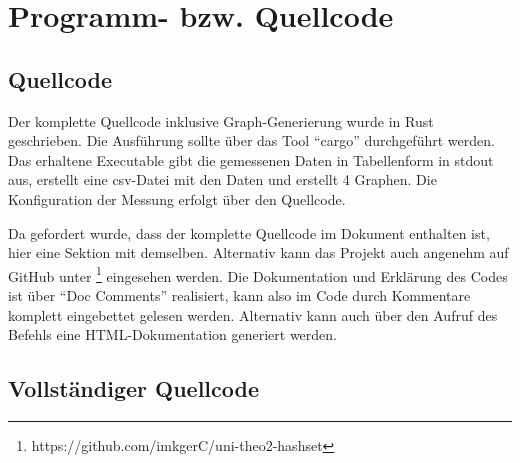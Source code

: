 \chapter{Programm- bzw. Quellcode}
\section{Quellcode}
Der komplette Quellcode inklusive Graph-Generierung wurde in Rust geschrieben. Die Ausführung sollte über das Tool \enquote{cargo} durchgeführt werden. Das erhaltene Executable gibt die gemessenen Daten in Tabellenform in stdout aus, erstellt eine csv-Datei mit den Daten und erstellt 4 Graphen. Die Konfiguration der Messung erfolgt über den Quellcode.

Da gefordert wurde, dass der komplette Quellcode im Dokument enthalten ist, hier eine Sektion mit demselben. Alternativ kann das Projekt auch angenehm auf GitHub unter \footnote{https://github.com/imkgerC/uni-theo2-hashset} eingesehen werden. Die Dokumentation und Erklärung des Codes ist über \enquote{Doc Comments} realisiert, kann also im Code durch Kommentare komplett eingebettet gelesen werden. Alternativ kann auch über den Aufruf des Befehls  eine HTML-Dokumentation generiert werden.
\section{Vollständiger Quellcode}








